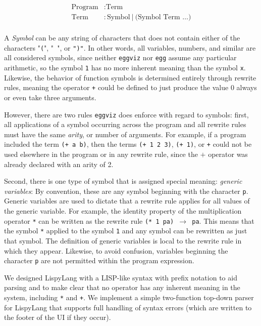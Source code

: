 \documentclass[letterpaper,twocolumn,11pt]{article}
\begin{document}
\noindent
\begin{align*}
\text{Program} &: \text{Term} \\
\text{Term} &: \text{Symbol}\ |\ \text{(Symbol Term \ldots)} \\
\end{align*}

A \textit{Symbol} can be any string of characters that does not contain either
of the characters "\texttt{(}", "\texttt{ }", or \texttt{")"}. In other words,
all variables, numbers, and similar are all considered symbols, since neither
\texttt{eggviz} nor \texttt{egg} assume any particular arithmetic, so the symbol
\texttt{1} has no more inherent meaning than the symbol \texttt{x}. Likewise,
the behavior of function symbols is determined entirely through rewrite rules,
meaning the operator \texttt{+} could be defined to just produce the value 0
always or even take three arguments.

However, there are two rules \texttt{eggviz} does enforce with regard to
symbols: first, all applications of a symbol occurring across the program and
all rewrite rules must have the same \textit{arity}, or number of arguments. For
example, if a program included the term \texttt{(+ a b)}, then the terms
\texttt{(+ 1 2 3)}, \texttt{(+ 1)}, or \texttt{+} could not be used elsewhere in
the program or in any rewrite rule, since the $+$ operator was already declared
with an arity of 2.

Second, there is one type of symbol that is assigned special meaning:
\textit{generic variables}: By convention, these are any symbol beginning with
the character \texttt{p}. Generic variables are used to dictate that a rewrite
rule applies for all values of the generic variable. For example, the identity
property of the multiplication operator \texttt{*} can be written as the rewrite
rule \texttt{(* 1 pa) $\rightarrow$ pa}. This means that the symbol \texttt{*}
applied to the symbol \texttt{1} and any symbol can be rewritten as just that
symbol. The definition of generic variables is local to the rewrite rule in
which they appear. Likewise, to avoid confusion, variables beginning the
character \texttt{p} are not permitted within the program expression.

We designed LispyLang with a LISP-like syntax with prefix notation to aid
parsing and to make clear that no operator has any inherent meaning in the
system, including \texttt{*} and \texttt{+}. We implement a simple two-function
top-down parser for LispyLang that supports full handling of syntax errors
(which are written to the footer of the UI if they occur).
\end{document}
